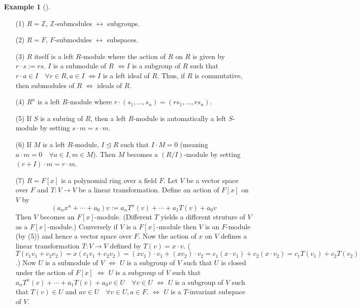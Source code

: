 \documentclass{article}
\theoremstyle{definition}
\newtheorem{ex}{Example}
\newenvironment{exs}[1][]{%
  \begin{ex}[#1]$ $\par\nobreak\ignorespaces
}{%
  \end{ex}
}
\newcommand{\ZZ}{\mathbb Z}
\newcommand{\Lra}{\Leftrightarrow}
\newcommand{\lra}{\leftrightarrow}
\newcommand{\normto}{\trianglelefteq}
\begin{document}
\begin{exs}
	\begin{enumerate}
		\item[(1)] $R = \ZZ$, $\ZZ$-submodules $\lra$ subgroups.

		\item[(2)] $R = F$, $F$-submodules $\lra$ subspaces.

		\item[(3)] $R$ itself is a left $R$-module where the action of $R$ on $R$ is given by $r \cdot s := rs$.
			$I$ is a submodule of $R$ $\Lra I$ is a subgroup of $R$ such that $r \cdot a \in I \quad \forall r \in R, a \in I$ $\Lra I$ is a left ideal of $R$.
			Thus, if $R$ is commutative, then submodules of $R$ $\Lra$ ideals of $R$.

		\item[(4)] $R^n$ is a left $R$-module where $r \cdot (s_1, ..., s_n) = (r s_1, ..., r s_n)$.

		\item[(5)] If $S$ is a subring of $R$, then a left $R$-module is automatically a left $S$-module by setting $s \cdot m = s \cdot m$.

		\item[(6)] If $M$ is a left $R$-module, $I \normto R$ such that $I \cdot M = 0$ (meaning $a \cdot m = 0 \quad \forall a \in I ,m \in M$).
			Then $M$ becomes a $(R/I)$-module by setting $(r + I) \cdot m = r \cdot m$.

		\item[(7)] $R = F[x]$ is a polynomial ring over a field $F$.
			Let $V$ be a vector space over $F$ and $T: V \to V$ be a linear transformation.
			Define an action of $F[x]$ on $V$ by
			\[
				(a_n x^n + \cdots + a_0) v := a_n T^n(v) + \cdots + a_1 T(v) + a_0 v
			\]
			Then $V$ becomes an $F[x]$-module.
			(Different $T$ yields a different struture of $V$ as a $F[x]$-module.)
			Conversely if $V$ is a $F[x]$-module then $V$ is an $F$-module (by (5)) and hence a vector space over $F$.
			Now the action of $x$ on $V$ defines a linear transformation $T: V \to V$ defined by $T(v) = x \cdot v$.
			($T(c_1 v_1 + c_2 v_2) = x (c_1 v_1 + c_2 v_2) = (x c_1) \cdot v_1 + (x c_2) \cdot v_2 = c_1 (x \cdot v_1) + c_2 (x \cdot v_2) = c_1 T(v_1) + c_2 T(v_2)$.)
			Now $U$ is a submodule of $V$ $\Lra$ $U$ is a subgroup of $V$ such that $U$ is closed under the action of $F[x]$ 
			$\Lra$ $U$ is a subgroup of $V$ such that $a_n T^n (v) + \cdots + a_1 T(v) + a_0 v \in U \quad \forall v \in U$ 
			$\Lra$ $U$ is a subgroup of $V$ such that $T(v) \in U$ and $av \in U \quad \forall v \in U, a \in F$.
			$\Lra$ $U$ is a $T$-invariant subspace of $V$.
	\end{enumerate}
\end{exs}
\end{document}

